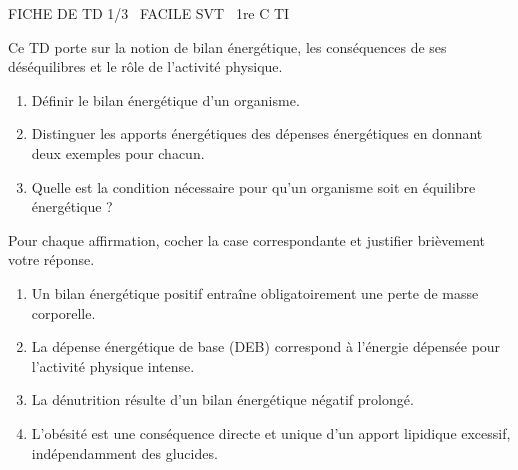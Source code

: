 \documentclass[11pt]{article}
\begin{document}
\begin{tcolorbox}[enhanced,colback=popink,colframe=popink,arc=10pt,boxrule=0pt,left=12pt,right=12pt,top=9pt,bottom=9pt]
{\color{white}\popxbold\small FICHE DE TD 1/3 \textbullet\ FACILE \hfill SVT \textbullet\ 1re C TI\par}
\end{tcolorbox}
\vspace{4pt}
Ce TD porte sur la notion de bilan énergétique, les conséquences de ses déséquilibres et le rôle de l'activité physique.

\begin{exercice}
\begin{enumerate}
    \item Définir le bilan énergétique d'un organisme.
    \item Distinguer les apports énergétiques des dépenses énergétiques en donnant deux exemples pour chacun.
    \item Quelle est la condition nécessaire pour qu'un organisme soit en équilibre énergétique ?
\end{enumerate}
\end{exercice}

\begin{exercice}
Pour chaque affirmation, cocher la case correspondante et justifier brièvement votre réponse.
\begin{enumerate}
    \item Un bilan énergétique positif entraîne obligatoirement une perte de masse corporelle. \hfill {} \quad {}
    \item La dépense énergétique de base (DEB) correspond à l'énergie dépensée pour l'activité physique intense. \hfill {} \quad {}
    \item La dénutrition résulte d'un bilan énergétique négatif prolongé. \hfill {} \quad {}
    \item L'obésité est une conséquence directe et unique d'un apport lipidique excessif, indépendamment des glucides. \hfill {} \quad {}
\end{enumerate}
\end{exercice}
\end{document}
